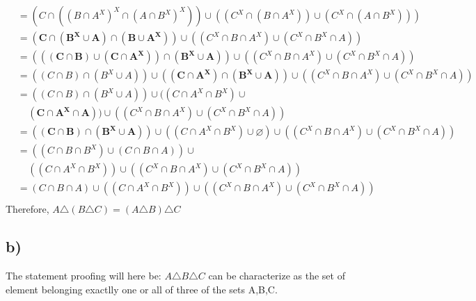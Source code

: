 \documentclass[a4paper,fleqn]{article}
\begin{document}
\begin{align*}
                                        &=(C\cap((B\cap A^X)^X \cap (A\cap B^X)^X)) \cup ((C^X\cap (B\cap A^X)) \cup (C^X\cap (A\cap B^X)))\\
                                        &=\mathbf{(C\cap (B^X\cup A)\cap (B \cup A^X))}\cup ((C^X \cap B\cap A^X)\cup (C^X\cap B^X \cap A))\\
                                        &=\mathbf{(((C\cap B)\cup (C\cap A^X)) \cap (B^X\cup A))}\cup ((C^X \cap B\cap A^X)\cup (C^X\cap B^X \cap A))\\
                                        &=((C\cap B)\cap (B^X\cup A)) \cup \mathbf{((C\cap A^X) \cap (B^X\cup A))}\cup ((C^X \cap B\cap A^X)\cup (C^X\cap B^X \cap A))\\
                                        &=((C\cap B)\cap (B^X\cup A)) \cup ((C\cap A^X \cap B^X)\cup \\ & \ \ \ \ \ \mathbf{(C\cap A^X \cap A)})\cup ((C^X \cap B\cap A^X)\cup (C^X\cap B^X \cap A))\\
                                        &=\mathbf{((C\cap B)\cap (B^X\cup A))} \cup ((C\cap A^X \cap B^X)\cup \mathbf{\varnothing})\cup ((C^X \cap B\cap A^X)\cup (C^X\cap B^X \cap A))\\
                                        &=((C\cap B \cap B^X)\cup (C \cap B \cap A))\cup\\ & \ \ \ \ \  ((C\cap A^X \cap B^X))\cup ((C^X \cap B\cap A^X)\cup (C^X\cap B^X \cap A))\\
                                        &=(C \cap B \cap A)\cup ((C\cap A^X \cap B^X))\cup ((C^X \cap B\cap A^X)\cup (C^X\cap B^X \cap A))\\
        \end{align*}
        Therefore, \(A \triangle (B \triangle C)=(A \triangle B) \triangle C\)
    \subsection*{b)}
        The statement proofing will here be: \(A\triangle B \triangle C\) can be characterize as the set of element belonging exactlly one or all of three of the sets A,B,C.
\end{document}
